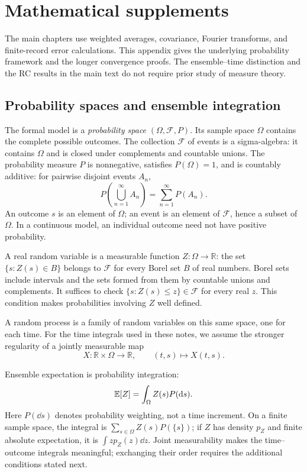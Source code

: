 \clearpage
\appendix
\section{Mathematical supplements}
\label{app:math}
The main chapters use weighted averages, covariance, Fourier transforms, and finite-record error calculations. This appendix gives the underlying probability framework and the longer convergence proofs. The ensemble--time distinction and the RC results in the main text do not require prior study of measure theory.

\subsection{Probability spaces and ensemble integration}
\label{app:probability}
The formal model is a \emph{probability space} $(\Omega,\mathcal F,P)$. Its sample space $\Omega$ contains the complete possible outcomes. The collection $\mathcal F$ of events is a sigma-algebra: it contains $\Omega$ and is closed under complements and countable unions. The probability measure $P$ is nonnegative, satisfies $P(\Omega)=1$, and is countably additive: for pairwise disjoint events $A_n$,
\[
P\!\left(\bigcup_{n=1}^{\infty}A_n\right)=\sum_{n=1}^{\infty}P(A_n).
\]
An outcome $s$ is an element of $\Omega$; an event is an element of $\mathcal F$, hence a subset of $\Omega$. In a continuous model, an individual outcome need not have positive probability.

A real random variable is a measurable function $Z:\Omega\to\mathbb R$: the set $\{s:Z(s)\in B\}$ belongs to $\mathcal F$ for every Borel set $B$ of real numbers. Borel sets include intervals and the sets formed from them by countable unions and complements. It suffices to check $\{s:Z(s)\leq z\}\in\mathcal F$ for every real $z$. This condition makes probabilities involving $Z$ well defined.

A random process is a family of random variables on this same space, one for each time. For the time integrals used in these notes, we assume the stronger regularity of a jointly measurable map
\begin{equation}
X:\mathbb R\times\Omega\longrightarrow\mathbb R,\qquad (t,s)\longmapsto X(t,s).
\label{eq:formal-process}
\end{equation}

Ensemble expectation is probability integration:
\[
\mathbb E[Z]=\int_\Omega Z(s)P(\mathrm d s).
\]
Here $P(\dd s)$ denotes probability weighting, not a time increment. On a finite sample space, the integral is $\sum_{s\in\Omega}Z(s)P(\{s\})$; if $Z$ has density $p_Z$ and finite absolute expectation, it is $\int zp_Z(z)\dd z$. Joint measurability makes the time--outcome integrals meaningful; exchanging their order requires the additional conditions stated next.

